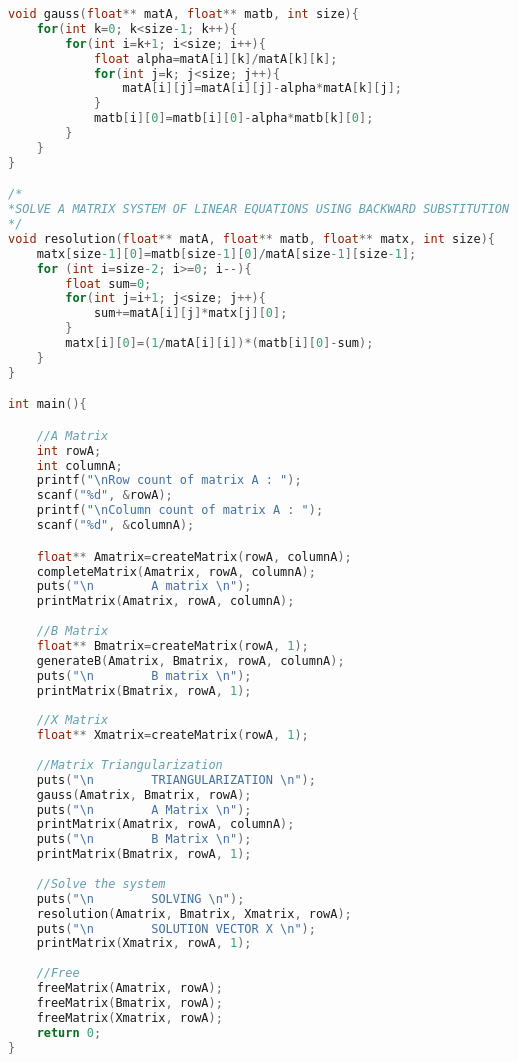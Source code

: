 \documentclass{report}
\begin{document}
\begin{lstlisting}[language=C,inputencoding=utf8, basicstyle=\fontsize{6}{8}\selectfont]
void gauss(float** matA, float** matb, int size){
	for(int k=0; k<size-1; k++){
		for(int i=k+1; i<size; i++){
			float alpha=matA[i][k]/matA[k][k];
			for(int j=k; j<size; j++){
				matA[i][j]=matA[i][j]-alpha*matA[k][j];
			}
			matb[i][0]=matb[i][0]-alpha*matb[k][0];
		}
	}
}

/*
*SOLVE A MATRIX SYSTEM OF LINEAR EQUATIONS USING BACKWARD SUBSTITUTION
*/
void resolution(float** matA, float** matb, float** matx, int size){
	matx[size-1][0]=matb[size-1][0]/matA[size-1][size-1];
	for (int i=size-2; i>=0; i--){
		float sum=0;
		for(int j=i+1; j<size; j++){
			sum+=matA[i][j]*matx[j][0];
		}
		matx[i][0]=(1/matA[i][i])*(matb[i][0]-sum);
	}
}

int main(){

	//A Matrix
	int rowA;
	int columnA;
	printf("\nRow count of matrix A : ");
	scanf("%d", &rowA);
	printf("\nColumn count of matrix A : ");
	scanf("%d", &columnA);

	float** Amatrix=createMatrix(rowA, columnA);
	completeMatrix(Amatrix, rowA, columnA);
	puts("\n		A matrix \n");
	printMatrix(Amatrix, rowA, columnA);
	
	//B Matrix
	float** Bmatrix=createMatrix(rowA, 1);
	generateB(Amatrix, Bmatrix, rowA, columnA);
	puts("\n		B matrix \n");
	printMatrix(Bmatrix, rowA, 1);
	
	//X Matrix
	float** Xmatrix=createMatrix(rowA, 1);
	
	//Matrix Triangularization
	puts("\n		TRIANGULARIZATION \n");
	gauss(Amatrix, Bmatrix, rowA);
	puts("\n		A Matrix \n");
	printMatrix(Amatrix, rowA, columnA);
	puts("\n		B Matrix \n");
	printMatrix(Bmatrix, rowA, 1);
	
	//Solve the system
	puts("\n		SOLVING \n");
	resolution(Amatrix, Bmatrix, Xmatrix, rowA);
	puts("\n		SOLUTION VECTOR X \n");
	printMatrix(Xmatrix, rowA, 1);
	
	//Free
	freeMatrix(Amatrix, rowA);
	freeMatrix(Bmatrix, rowA);
	freeMatrix(Xmatrix, rowA);
	return 0;
}
\end{lstlisting}
\end{document}
